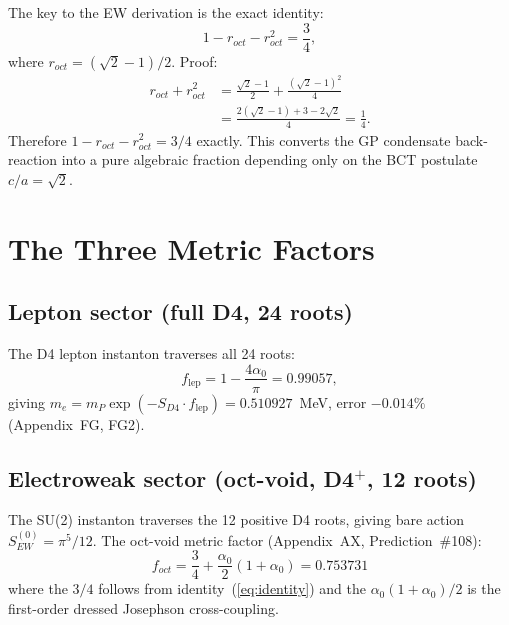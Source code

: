 \documentclass[aps,prl,twocolumn,superscriptaddress,floatfix]{revtex4-2}
\begin{document}
The key to the EW derivation is the exact identity:
\begin{equation}
1 - r_{oct} - r_{oct}^2 = \frac{3}{4},
\label{eq:identity}
\end{equation}
where $r_{oct} = (\sqrt{2}-1)/2$. Proof:
\begin{align}
r_{oct} + r_{oct}^2 &= \frac{\sqrt{2}-1}{2}
+ \frac{(\sqrt{2}-1)^2}{4} \nonumber\\
&= \frac{2(\sqrt{2}-1) + 3 - 2\sqrt{2}}{4} = \frac{1}{4}.
\end{align}
Therefore $1 - r_{oct} - r_{oct}^2 = 3/4$ exactly. This converts
the GP condensate back-reaction into a pure algebraic fraction
depending only on the BCT postulate $c/a=\sqrt{2}$.

\section{The Three Metric Factors}

\subsection{Lepton sector (full D4, 24 roots)}

The D4 lepton instanton traverses all 24 roots:
\begin{equation}
f_\text{lep} = 1 - \frac{4\alpha_0}{\pi} = 0.99057,
\end{equation}
giving $m_e = m_P\exp(-S_{D4}\cdot f_\text{lep})
= 0.510927$~MeV, error $-0.014\%$ (Appendix~FG, FG2).

\subsection{Electroweak sector (oct-void, D4$^+$, 12 roots)}

The SU(2) instanton traverses the 12 positive D4 roots,
giving bare action $S_{EW}^{(0)} = \pi^5/12$.
The oct-void metric factor (Appendix~AX, Prediction~\#108):
\begin{equation}
\boxed{f_{oct} = \frac{3}{4}
+ \frac{\alpha_0}{2}(1+\alpha_0) = 0.753731}
\label{eq:foct}
\end{equation}
where the $3/4$ follows from identity~(\ref{eq:identity}) and
the $\alpha_0(1+\alpha_0)/2$ is the first-order dressed
Josephson cross-coupling.

\noindent{}
\end{document}
